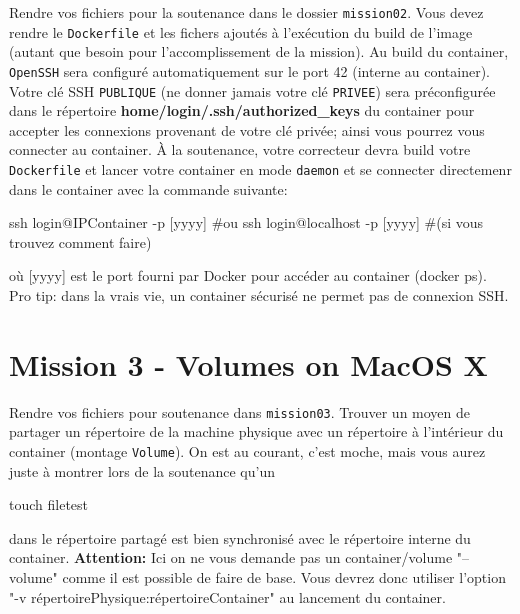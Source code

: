 \documentclass{42}
\begin{document}
Rendre vos fichiers pour la soutenance dans le dossier \texttt{mission02}. Vous devez rendre le \texttt{Dockerfile} et les fichers ajoutés à l'exécution du build de l'image (autant que besoin pour l'accomplissement de la mission).
\newline
\newline
Au build du container, \texttt{OpenSSH} sera configuré automatiquement sur le port 42 (interne au container). Votre clé SSH \texttt{PUBLIQUE} (ne donner jamais votre clé \texttt{PRIVEE}) sera préconfigurée dans le répertoire \textbf{home/login/.ssh/authorized\_keys} du container pour accepter les connexions provenant de votre clé privée; ainsi vous pourrez vous connecter au container.
\newline
\newline
À la soutenance, votre correcteur devra build votre \texttt{Dockerfile} et lancer votre container en mode \texttt{daemon} et se connecter directemenr dans le container avec la commande suivante:
\begin{42console}
ssh login@IPContainer -p [yyyy] #ou
ssh login@localhost -p [yyyy] #(si vous trouvez comment faire)
\end{42console}
où [yyyy] est le port fourni par Docker pour accéder au container (docker ps).
\newline
\newline
\info
{
	Pro tip: dans la vrais vie, un container sécurisé ne permet pas de connexion SSH.
}

	\newpage

\section{Mission 3 - Volumes on MacOS X}

Rendre vos fichiers pour soutenance dans \texttt{mission03}.
\newline
\newline
Trouver un moyen de partager un répertoire de la machine physique avec un répertoire à l'intérieur du container (montage \texttt{Volume}).
On est au courant, c’est moche, mais vous aurez juste à montrer lors de la soutenance qu’un
\begin{42console}
	touch filetest
\end{42console}
dans le répertoire partagé est bien synchronisé avec le répertoire interne du container.
\newline
\newline
\newline
\warn
{
\textbf{Attention:} Ici on ne vous demande pas un container/volume "--volume" comme il est possible de faire de base. Vous devrez donc utiliser l’option
"-v répertoirePhysique:répertoireContainer" au lancement du container.
}
\end{document}
